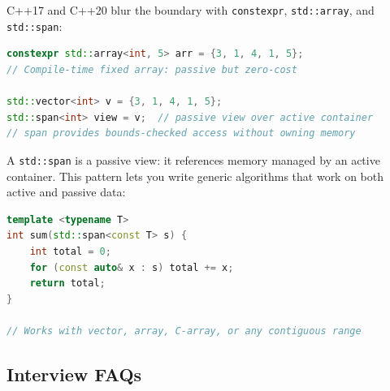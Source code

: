C++17 and C++20 blur the boundary with \texttt{constexpr}, \texttt{std::array}, and \texttt{std::span}:

\begin{lstlisting}[language=C++]
constexpr std::array<int, 5> arr = {3, 1, 4, 1, 5};
// Compile-time fixed array: passive but zero-cost

std::vector<int> v = {3, 1, 4, 1, 5};
std::span<int> view = v;  // passive view over active container
// span provides bounds-checked access without owning memory
\end{lstlisting}

A \texttt{std::span} is a passive view: it references memory managed by an active container. This pattern lets you write generic algorithms that work on both active and passive data:

\begin{lstlisting}[language=C++]
template <typename T>
int sum(std::span<const T> s) {
    int total = 0;
    for (const auto& x : s) total += x;
    return total;
}

// Works with vector, array, C-array, or any contiguous range
\end{lstlisting}

\subsection{Interview FAQs}

